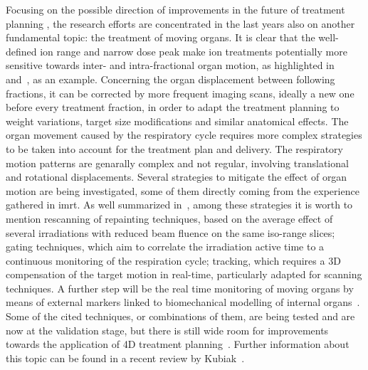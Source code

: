 Focusing on the possible direction of improvements in the future of treatment planning , the research efforts are concentrated in the last years also on another fundamental topic: the treatment of moving organs. It is clear that the well-defined ion range and narrow dose peak make ion treatments potentially more sensitive towards inter- and intra-fractional organ motion, as highlighted in~\cite{Phillips1992, Bert2008, Engelsman2013} and~\cite{Thornqvist2013}, as an example. Concerning the organ displacement between following fractions, it can be corrected by more frequent imaging scans, ideally a new one before every treatment fraction, in order to adapt the treatment planning to weight variations, target size modifications and similar anatomical effects. The organ movement caused by the respiratory cycle requires more complex strategies to be taken into account for the treatment plan and delivery. The respiratory motion patterns are genarally complex and not regular, involving translational and rotational displacements. Several strategies to mitigate the effect of organ motion are being investigated, some of them directly coming from the experience gathered in \gls{imrt}. As well summarized in~\cite{Schardt2010}, among these strategies it is worth to mention rescanning of repainting techniques, based on the average effect of several irradiations with reduced beam fluence on the same iso-range slices; gating techniques, which aim to correlate the irradiation active time to a continuous monitoring of the respiration cycle; tracking, which requires a 3D compensation of the target motion in real-time, particularly adapted for scanning techniques. A further step will be the real time monitoring of moving organs by means of external markers linked to biomechanical modelling of internal organs~\parencite{Manescu2013}. Some of the cited techniques, or combinations of them, are being tested and are now at the validation stage, but there is still wide room for improvements towards the application of 4D treatment planning~\parencite{Graeff2013, Bert2017}. Further information about this topic  can be found in a recent review by Kubiak~\parencite{Kubiak2016}.    
